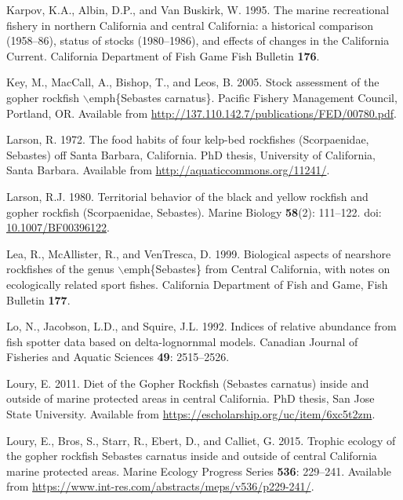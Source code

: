 \documentclass[12pt,]{article}
\begin{document}
\hypertarget{ref-Karpov1995}{}
Karpov, K.A., Albin, D.P., and Van Buskirk, W. 1995. The marine
recreational fishery in northern California and central California: a
historical comparison (1958--86), status of stocks (1980--1986), and
effects of changes in the California Current. California Department of
Fish Game Fish Bulletin \textbf{176}.

\hypertarget{ref-Key2005}{}
Key, M., MacCall, A., Bishop, T., and Leos, B. 2005. Stock assessment of
the gopher rockfish \(\backslash\)emph\{Sebastes carnatus\}. Pacific
Fishery Management Council, Portland, OR. Available from
\url{http://137.110.142.7/publications/FED/00780.pdf}.

\hypertarget{ref-Larson1972}{}
Larson, R. 1972. The food habits of four kelp-bed rockfishes
(Scorpaenidae, Sebastes) off Santa Barbara, California. PhD thesis,
University of California, Santa Barbara. Available from
\url{http://aquaticcommons.org/11241/}.

\hypertarget{ref-Larson1980}{}
Larson, R.J. 1980. Territorial behavior of the black and yellow rockfish
and gopher rockfish (Scorpaenidae, Sebastes). Marine Biology
\textbf{58}(2): 111--122. doi:
\href{https://doi.org/10.1007/BF00396122}{10.1007/BF00396122}.

\hypertarget{ref-Lea1999}{}
Lea, R., McAllister, R., and VenTresca, D. 1999. Biological aspects of
nearshore rockfishes of the genus \(\backslash\)emph\{Sebastes\} from
Central California, with notes on ecologically related sport fishes.
California Department of Fish and Game, Fish Bulletin \textbf{177}.

\hypertarget{ref-Lo1992}{}
Lo, N., Jacobson, L.D., and Squire, J.L. 1992. Indices of relative
abundance from fish spotter data based on delta-lognornmal models.
Canadian Journal of Fisheries and Aquatic Sciences \textbf{49}:
2515--2526.

\hypertarget{ref-Loury2011}{}
Loury, E. 2011. Diet of the Gopher Rockfish (Sebastes carnatus) inside
and outside of marine protected areas in central California. PhD thesis,
San Jose State University. Available from
\url{https://escholarship.org/uc/item/6xc5t2zm}.

\hypertarget{ref-Loury2015}{}
Loury, E., Bros, S., Starr, R., Ebert, D., and Calliet, G. 2015. Trophic
ecology of the gopher rockfish Sebastes carnatus inside and outside of
central California marine protected areas. Marine Ecology Progress
Series \textbf{536}: 229--241. Available from
\url{https://www.int-res.com/abstracts/meps/v536/p229-241/}.
\end{document}
